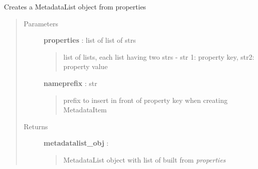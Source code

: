 \documentclass[letterpaper,10pt,english]{sphinxmanual}
\begin{document}
\begin{fulllineitems}
\label{pytan.utils:pytan.utils.build_metadatalist_obj}
Creates a MetadataList object from properties
\begin{quote}\begin{description}
\item[{Parameters}] \leavevmode
\textbf{properties} : list of list of strs
\begin{quote}

list of lists, each list having two strs - str 1: property key, str2: property value
\end{quote}

\textbf{nameprefix} : str
\begin{quote}

prefix to insert in front of property key when creating MetadataItem
\end{quote}

\item[{Returns}] \leavevmode
\textbf{metadatalist\_obj} : {\hyperref[taniumpy.object_types:taniumpy.object_types.metadata_list.MetadataList]{}}
\begin{quote}

MetadataList object with list of {\hyperref[taniumpy.object_types:taniumpy.object_types.metadata_item.MetadataItem]{}} built from \emph{properties}
\end{quote}

\end{description}\end{quote}

\end{fulllineitems}

\end{document}
